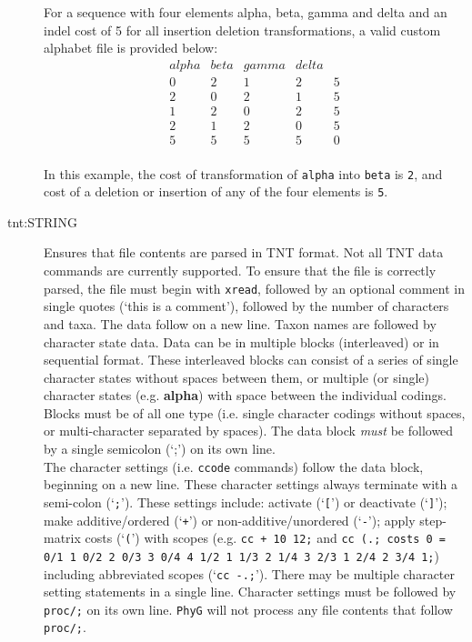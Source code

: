 \begin{description}
		For a sequence with four elements alpha, beta, gamma and delta and an indel cost of 5 
		for all insertion deletion transformations, a valid custom alphabet file is provided below:
		\\
		\begin{equation*}
		\begin{array}{lllll}
		alpha & beta & gamma & delta &  \\
		0 &   2 &  1 &   2 &   5 \\
		2 &   0 &  2 &   1 &   5 \\
		1 &   2 &  0 &   2 &   5 \\
		2 &   1 &  2 &   0 &   5 \\
		5 &   5 &  5 &   5 &   0
		\end{array}
		\end{equation*} 
		\\
		
		In this example, the cost of transformation of \texttt{alpha} into \texttt{beta} is \texttt{2},
		and cost of a deletion or insertion of any of the four elements is \texttt{5}.

		\item [tnt:STRING] Ensures that file contents are parsed in TNT \citep{Goloboffetal2008} 
		format. Not all TNT data commands are currently supported. To ensure that the file is 
		correctly parsed, the file must begin with \texttt{xread}, followed by an optional comment 
		in single quotes (`this is a comment'), followed by the number of characters and taxa. The 
		data follow on a new line. Taxon names are followed by character state data. Data can be in 
		multiple blocks (interleaved) or in sequential format. These interleaved blocks can consist 
		of a series of single character states without spaces between them, or multiple (or single) 
		character states (e.g. \textbf{alpha}) with space between the individual codings. Blocks 
		must be of all one type (i.e. single character codings without spaces, or multi-character 
		separated by spaces). The data block \textit{must} be followed by a single semicolon 
		(`;') on its own line.\\
			
		The character settings (i.e. \texttt{ccode} commands) follow the data block, beginning 
		on a 	new line. These character settings always terminate with a semi-colon (`\texttt{;}'). 
		These settings include: activate (`\texttt{[}') or deactivate (`\texttt{]}'); make additive/ordered 
		(`\texttt{+}') or non-additive/unordered (`\texttt{-}'); apply step-matrix costs (`\texttt{(}') with 
		scopes (e.g. \texttt{cc + 10 12;} and  \texttt{cc (.; costs 0 = 0/1 1 0/2 2 0/3 3 0/4 4 1/2 1 
		1/3 2 1/4 3 2/3 1 2/4 2 3/4 1;}) including abbreviated scopes (`\texttt{cc -.;}'). There may 
		be multiple character setting statements in a single line. Character settings must be 
		followed by \texttt{proc/;} on its own line. \texttt{PhyG} will not process
		any file contents that follow \texttt{proc/;}.\\
		  

\end{description}
